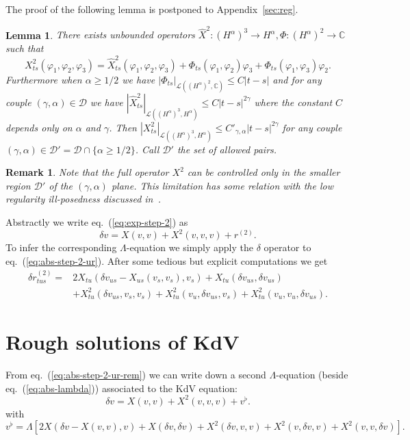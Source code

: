 \documentclass[a4paper,12pt,reqno]{article}
\newcommand{\der}{\delta}
\newcommand{\DD}{\mathcal{D}}
\newcommand{\LL}{\mathcal{L}}
\newtheorem{lemma}[theorem]{Lemma}
\newtheorem{remark}[theorem]{Remark}
\begin{document}
The proof of the following lemma is postponed to Appendix~\ref{sec:reg}.
\begin{lemma}
\label{lemma:X2}
There exists unbounded operators $\hat X^2: (H^\alpha)^3 \to H^\alpha, \Phi:  (H^\alpha)^2 \to \mathbb{C}$ such that
$$
X^2_{ts} (\varphi_1,\varphi_2,\varphi_3) = \hat X^2_{ts} (\varphi_1,\varphi_2,\varphi_3) + \Phi_{ts}(\varphi_1,\varphi_2) \varphi_3  + \Phi_{ts}(\varphi_1,\varphi_3) \varphi_2.
$$
Furthermore   when $\alpha \ge 1/2$ we have $|\Phi_{ts}|_{\LL((H^{\alpha})^2,\mathbb{C})} \le C |t-s|$ and for any couple
$(\gamma,\alpha) \in  \DD$
we have
$
|\hat X^2_{ts}|_{\LL((H^{\alpha})^3,H^{\alpha})} \le C |t-s|^{2\gamma}
$
where the constant $C$ depends only on $\alpha$ and $\gamma$.
Then 
$
| X^2_{ts}|_{\LL((H^{\alpha})^3,H^{\alpha})} \le C'_{\gamma,\alpha} |t-s|^{2\gamma}
$
for any couple $(\gamma,\alpha) \in  \DD' = \DD \cap \{\alpha\ge 1/2\} $. Call $\DD'$ the set of \emph{allowed pairs}.
\end{lemma}


\begin{remark}
Note that the full operator $X^2$ can be controlled only in the smaller
region $\DD'$ of the $(\gamma,\alpha)$ plane. This limitation has some
relation with the low regularity ill-posedness discussed in~\cite{MR2018661}.     
\end{remark}

\bigskip
Abstractly we write eq.~(\ref{eq:exp-step-2}) as
\begin{equation}
  \label{eq:abs-step-2-ur}
\der v = X(v,v) + X^2(v,v,v) + r^{(2)}.  
\end{equation}
To infer the corresponding $\Lambda$-equation  we simply apply the $\der$ operator to
eq.~(\ref{eq:abs-step-2-ur}). After some tedious but explicit
computations we get
\begin{equation}
  \label{eq:abs-step-2-ur-rem}
  \begin{split}
\der r^{(2)}_{tus} = & 2 X_{tu}(\der v_{us}- X_{us}(v_s,v_s),v_s) 
+ X_{tu}(\der v_{us},\der v_{us}) 
\\ & + X^2_{tu}(\der v_{us},v_s,v_s) +
X^2_{tu}(v_u,\der v_{us},v_s) + X^2_{tu}( v_u,v_u,\der v_{us}).     
  \end{split}
\end{equation}

\section{Rough solutions of KdV}
\label{sec:rough}
From eq.~(\ref{eq:abs-step-2-ur-rem}) we can write down
 a second $\Lambda$-equation (beside eq.~(\ref{eq:abs-lambda})) associated to the KdV equation:
\begin{equation}
  \label{eq:abs-step-2}
\der v = X(v,v) + X^2(v,v,v) + v^\flat.  
\end{equation}
with
$$
v^\flat = \Lambda[ 2 X(\der v- X(v,v),v) 
+ X(\der v,\der v) 
 + X^2(\der v,v,v) +
X^2(v,\der v,v) + X^2( v,v,\der v)   ].
$$
\end{document}
